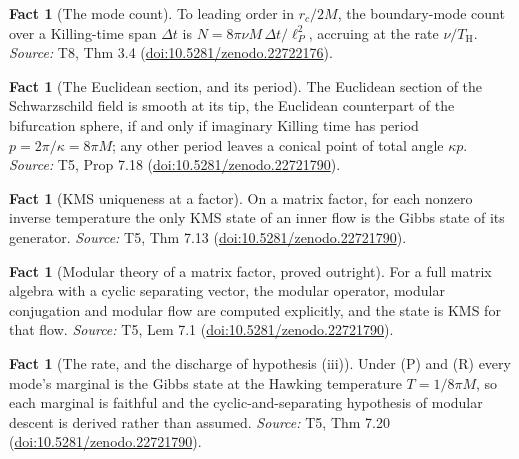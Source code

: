 \documentclass[11pt]{article}
\theoremstyle{definition}
\newtheorem{fact}[theorem]{Fact}
\theoremstyle{plain}
\providecommand{\TH}{}\renewcommand{\TH}{T_{\mathrm{H}}}
\providecommand{\lP}{}\renewcommand{\lP}{\ell_{P}}
\begin{document}
\begin{fact}[The mode count]\label{c:scrambling.mode-count}
To leading order in $r_c/2M$, the boundary-mode count over a Killing-time span $\Delta t$ is $N = 8\pi\nu M\,\Delta t/\lP^2$, accruing at the rate $\nu/\TH$.
\emph{Source:} T8, Thm 3.4 (\href{https://doi.org/10.5281/zenodo.22722176}{doi:10.5281/zenodo.22722176}).
\end{fact}

\begin{fact}[The Euclidean section, and its period]\label{c:singularity.euclidean-section-period}
The Euclidean section of the Schwarzschild field is smooth at its tip, the Euclidean counterpart of the bifurcation sphere, if and only if imaginary Killing time has period $p = 2\pi/\kappa = 8\pi M$; any other period leaves a conical point of total angle $\kappa p$.
\emph{Source:} T5, Prop 7.18 (\href{https://doi.org/10.5281/zenodo.22721790}{doi:10.5281/zenodo.22721790}).
\end{fact}

\begin{fact}[KMS uniqueness at a factor]\label{c:singularity.kms-uniqueness-factor}
On a matrix factor, for each nonzero inverse temperature the only KMS state of an inner flow is the Gibbs state of its generator.
\emph{Source:} T5, Thm 7.13 (\href{https://doi.org/10.5281/zenodo.22721790}{doi:10.5281/zenodo.22721790}).
\end{fact}

\begin{fact}[Modular theory of a matrix factor, proved outright]\label{c:singularity.modular-theory-matrix-factor-proved-outright}
For a full matrix algebra with a cyclic separating vector, the modular operator, modular conjugation and modular flow are computed explicitly, and the state is KMS for that flow.
\emph{Source:} T5, Lem 7.1 (\href{https://doi.org/10.5281/zenodo.22721790}{doi:10.5281/zenodo.22721790}).
\end{fact}

\begin{fact}[The rate, and the discharge of hypothesis (iii)]\label{c:singularity.rate-discharge-hypothesis-iii}
Under (P) and (R) every mode's marginal is the Gibbs state at the Hawking temperature $T = 1/8\pi M$, so each marginal is faithful and the cyclic-and-separating hypothesis of modular descent is derived rather than assumed.
\emph{Source:} T5, Thm 7.20 (\href{https://doi.org/10.5281/zenodo.22721790}{doi:10.5281/zenodo.22721790}).
\end{fact}
\end{document}
